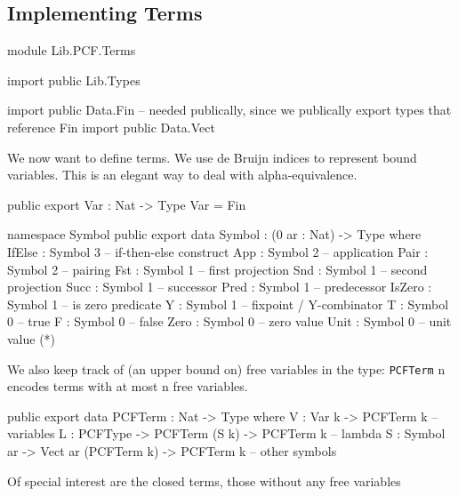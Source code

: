 \subsection{Implementing Terms}

\begin{hidden}
module Lib.PCF.Terms

import public Lib.Types

import public Data.Fin  -- needed publically, since we publically export types that reference Fin
import public Data.Vect

\end{hidden}

We now want to define terms. We use de Bruijn indices to represent bound variables.
This is an elegant way to deal with alpha-equivalence.

\begin{code}
public export
Var : Nat -> Type
Var = Fin
\end{code}


\begin{code}
namespace Symbol
  public export
  data Symbol : (0 ar : Nat) -> Type where
    IfElse : Symbol 3       -- if-then-else construct
    App    : Symbol 2       -- application
    Pair   : Symbol 2       -- pairing
    Fst    : Symbol 1       -- first projection
    Snd    : Symbol 1       -- second projection
    Succ   : Symbol 1       -- successor
    Pred   : Symbol 1       -- predecessor
    IsZero : Symbol 1       -- is zero predicate
    Y      : Symbol 1       -- fixpoint / Y-combinator
    T      : Symbol 0       -- true
    F      : Symbol 0       -- false
    Zero   : Symbol 0       -- zero value
    Unit   : Symbol 0       -- unit value (*)
\end{code}

We also keep track of (an upper bound on) free variables in the type:
\lstinline{PCFTerm} n encodes terms with at most n free variables.

\begin{code}
public export
data PCFTerm : Nat -> Type where
  V    : Var k -> PCFTerm k                             -- variables
  L    : PCFType   -> PCFTerm (S k) -> PCFTerm k        -- lambda
  S    : Symbol ar -> Vect ar (PCFTerm k) -> PCFTerm k  -- other symbols
\end{code}

Of special interest are the closed terms, those without any free variables

